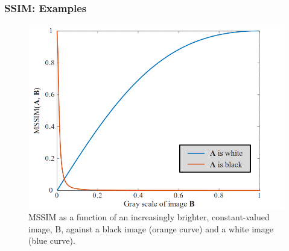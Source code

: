 \documentclass[13.5pt,aspecratio=169, xcolor=dvipsnames]{beamer}
\begin{document}
\begin{frame}
    \onehalfspacing
        \frametitle{SSIM: Examples}
        
        \begin{minipage}{0.6\textwidth}
            \begin{figure}
                \centering
                \includegraphics[width=\linewidth]{MSSIM_Fig_1.png}
                \captionsetup{labelformat=empty}
                \caption{{\tiny MSSIM as a function of an increasingly brighter, constant-valued
                image, B, against a black image (orange curve) and a white image (blue curve).}}
            \end{figure}
        \end{minipage}
        \begin{minipage}{0.39\textwidth}
            \begin{figure}
                \centering

\end{figure}
\end{minipage}
\end{frame}
\end{document}

